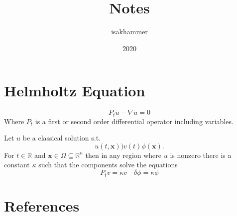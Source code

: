 \documentclass{article}
\title{Notes}
\author{isakhammer }
\date{2020}
\theoremstyle{remark}
\begin{document}
\maketitle
\tableofcontents
\newpage

\newpage
\section{Helmholtz Equation}%
\label{sec:helmholtz_equation}

\[
P_{t} u - \nabla u = 0
\] 
Where $P_{t}$ is a first or second order differential operator including variables.  

\begin{lemma}
  Let $u$ be a classical solution s.t. \[
    u\left( t,\mathbf{x} \right) ) v\left( t \right) \phi \left( \mathbf{x} \right).
  \] 
  For $t \in \mathbb{R}  $ and $\mathbf{x} \in  \Omega \subseteq  \mathbb{R} ^{n} $   then in any region where $u$ is nonzero there is a constant $\kappa     $ such that the components solve the equations \[
  P_{t} v = \kappa v \quad  \delta \phi = \kappa \phi  
  \]  
\end{lemma}


\newpage
\section{References}%
\label{sec:references}



\end{document}
